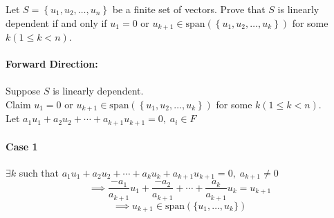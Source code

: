 Let $S = \left\{u_1,u_2,\dots,u_n\right\}$ be a finite set of
vectors. Prove that $S$ is linearly dependent if and only if $u_1 =0$
or $u_{k+1} \in
\text{span}\left(\left\{u_1,u_2,\dots,u_k\right\}\right)$ for some $k
\left(1 \leq k < n\right)$.
\\\hfill\\
\textbf{Forward Direction:}\\
\\Suppose $S$ is linearly dependent.
\\Claim $u_1 =0$
or $u_{k+1} \in
\text{span}\left(\left\{u_1,u_2,\dots,u_k\right\}\right)$ for some $k
\left(1 \leq k < n\right)$.
\\Let $a_1u_1 +a_2u_2 +\cdots+a_{k+1}u_{k+1}=0,\; a_i \in F$
\paragraph{Case 1} $\exists k$ such that $a_1u_1 +a_2u_2
+\cdots+a_ku_k+a_{k+1}u_{k+1}=0,\;a_{k+1} \neq 0$
\begin{equation}
\implies \frac{-a_1}{a_{k+1}}u_1 + \frac{-a_2}{a_{k+1}} +\cdots +
\frac{a_k}{a_{k+1}}u_k = u_{k+1}
\end{equation}
\begin{equation}
\implies u_{k+1} \in \text{span}(\{u_1,\dots,u_k\})
\end{equation}
